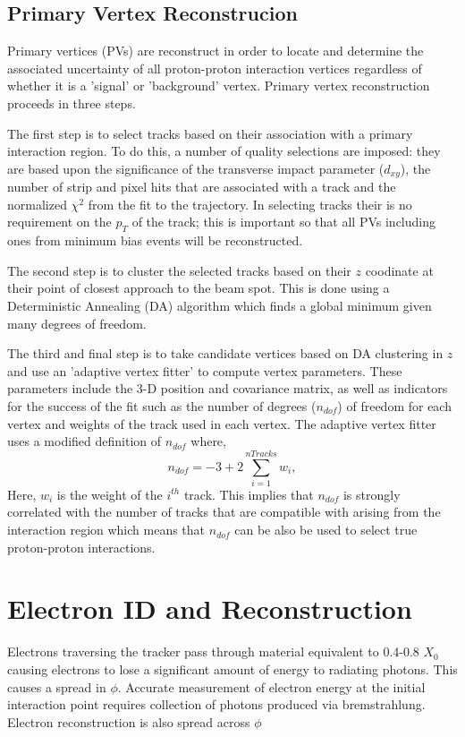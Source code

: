 \subsection{Primary Vertex Reconstrucion}
Primary vertices (PVs) are reconstruct in order to locate and determine the associated uncertainty of all
proton-proton interaction vertices regardless of whether it is a 'signal' or 'background' vertex.
Primary vertex reconstruction proceeds in three steps.

The first step is to select tracks based on their association with a primary interaction region.
To do this, a number of quality selections are imposed: they are based upon the significance of the
transverse impact parameter ($d_{xy}$), the number of strip and pixel hits that are 
associated with a track and the normalized $\chi^{2}$ from the fit to the
trajectory. In selecting tracks their is no requirement on the $p_{T}$ of the track; 
this is important so that all PVs including ones from minimum bias events will be reconstructed.

The second step is to cluster the selected tracks based on their $z$ coodinate at their
point of closest approach to the beam spot. This is done using a Deterministic Annealing (DA)
algorithm which finds a global minimum given many degrees of freedom.%

The third and final step is to take candidate vertices based on DA clustering in $z$ and use
an 'adaptive vertex fitter' %
to compute vertex parameters. These parameters include the 3-D position and covariance matrix,
as well as indicators for the success of the fit such as the number of degrees ($n_{dof}$) of freedom for
each vertex and weights of the track used in each vertex. The adaptive vertex fitter
uses a modified definition of $n_{dof}$ where,
\begin{equation}
n_{dof} = -3+2\sum^{nTracks}_{i=1} w_{i},
\end{equation}
Here, $w_{i}$ is the weight of the $i^{th}$ track. This implies that $n_{dof}$ is strongly
correlated with the number of tracks that are compatible with arising from the interaction
region which means that $n_{dof}$ can be also be used to select true proton-proton interactions.

\section{Electron ID and Reconstruction}
\label{sec:electronReco}
Electrons traversing the tracker pass through 
material equivalent to 0.4-0.8 $X_{0}$ %
causing electrons to lose a significant amount of 
energy to radiating photons. %
This causes a spread in $\phi$. %
Accurate measurement of electron energy 
at the initial interaction point
requires collection of photons produced via bremstrahlung.
Electron reconstruction is also spread across $\phi$

